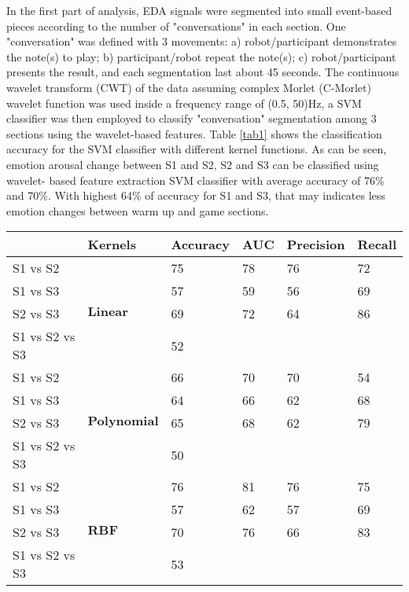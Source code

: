 \documentclass[conference]{IEEEtran}
\begin{document}
In the first part of analysis, EDA signals were segmented into small event-based pieces according to 
the number of "conversations" in each section. One "conversation" was defined with 3 movements:
a) robot/participant demonstrates the note(s) to play; b) participant/robot repeat the note(s); 
c) robot/participant presents the result, and each segmentation last about 45 seconds. The 
continuous wavelet transform (CWT) of the data assuming complex Morlet (C-Morlet) wavelet function
was used inside a frequency range of (0.5, 50)Hz, a SVM classifier was then employed to classify
"conversation" segmentation among 3 sections using the wavelet-based features. Table \ref{tab1}
shows the classification accuracy for the SVM classifier with different kernel functions. 
As can be seen, emotion arousal change between S1 and S2, S2 and S3 can be classified using wavelet-
based feature extraction SVM classifier with average accuracy of 76\% and 70\%. With highest 64\% of accuracy
for S1 and S3, that may indicates less emotion changes between warm up and game sections. 

\begin{table*}[tbp]
	\caption{Emotion Change in Different Sections}
	\begin{center}
	\begin{tabular}{llllll}
		& Kernels                     & Accuracy & AUC & Precision & Recall \\
		\hline
		S1 vs S2       & \multirow{4}{*}{\textbf{Linear}}     & 75       & 78  & 76        & 72     \\
		S1 vs S3       &                             & 57       & 59  & 56        & 69     \\
		S2 vs S3       &                             & 69       & 72  & 64        & 86     \\
		S1 vs S2 vs S3 &                             & \multicolumn{4}{l}{52}              \\
		\hline
		S1 vs S2       & \multirow{4}{*}{\textbf{Polynomial}} & 66       & 70  & 70        & 54     \\
		S1 vs S3       &                             & 64       & 66  & 62        & 68     \\
		S2 vs S3       &                             & 65       & 68  & 62        & 79     \\
		S1 vs S2 vs S3 &                             & \multicolumn{4}{l}{50}              \\
		\hline
		S1 vs S2       & \multirow{4}{*}{\textbf{RBF}}        & 76       & 81  & 76        & 75     \\
		S1 vs S3       &                             & 57       & 62  & 57        & 69     \\
		S2 vs S3       &                             & 70       & 76  & 66        & 83     \\
		S1 vs S2 vs S3 &                             & \multicolumn{4}{l}{53}              \\
		\hline
	\end{tabular}
	\label{tab1}
	\end{center}
\end{table*}
\end{document}
